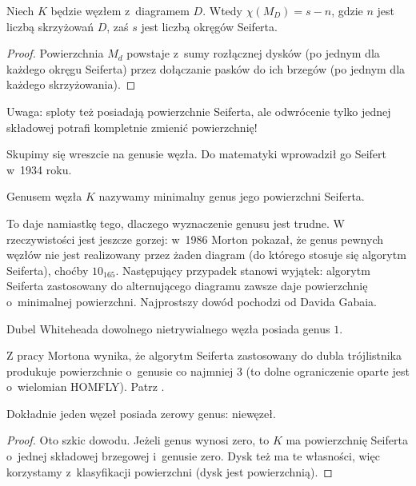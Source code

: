 
\begin{proposition}
    Niech $K$ będzie węzłem z~diagramem $D$. Wtedy $\chi(M_D) = s - n$, gdzie $n$ jest liczbą skrzyżowań $D$, zaś $s$ jest liczbą okręgów Seiferta.
\end{proposition}

\begin{proof}
    Powierzchnia $M_d$ powstaje z~sumy rozłącznej dysków (po jednym dla każdego okręgu Seiferta) przez dołączanie pasków do ich brzegów (po jednym dla każdego skrzyżowania).
\end{proof}

Uwaga: sploty też posiadają powierzchnie Seiferta, ale odwrócenie tylko jednej składowej potrafi kompletnie zmienić powierzchnię!

Skupimy się wreszcie na genusie węzła.
Do matematyki wprowadził go Seifert w~1934 roku.

\begin{definition}
    Genusem węzła $K$ nazywamy minimalny genus jego powierzchni Seiferta.
\end{definition}

To daje namiastkę tego, dlaczego wyznaczenie genusu jest trudne.
W rzeczywistości jest jeszcze gorzej: w~1986 Morton pokazał, że genus pewnych węzłów nie jest realizowany przez żaden diagram (do którego stosuje się algorytm Seiferta), choćby $10_{165}$.
Następujący przypadek stanowi wyjątek: algorytm Seiferta zastosowany do alternującego diagramu zawsze daje powierzchnię o~minimalnej powierzchni.
Najprostszy dowód pochodzi od Davida Gabaia.

\begin{example}
    Dubel Whiteheada dowolnego nietrywialnego węzła posiada genus $1$.
\end{example}

Z pracy Mortona wynika, że algorytm Seiferta zastosowany do dubla trójlistnika produkuje powierzchnie o~genusie co najmniej $3$ (to dolne ograniczenie oparte jest o~wielomian HOMFLY).
Patrz \cite{morton86}.

\begin{proposition}
\label{genus_one}
    Dokładnie jeden węzeł posiada zerowy genus: niewęzeł.
\end{proposition}

\begin{proof}
    Oto szkic dowodu.
    Jeżeli genus wynosi zero, to $K$ ma powierzchnię Seiferta o~jednej składowej brzegowej i~genusie zero.
Dysk też ma te własności, więc korzystamy z~klasyfikacji powierzchni (dysk jest powierzchnią).
\end{proof}

